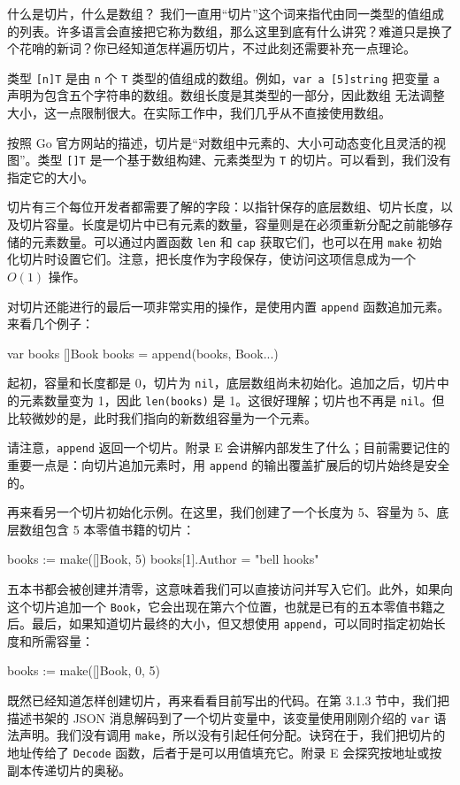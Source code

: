 \begin{infobox}{什么是切片，什么是数组？}
我们一直用“切片”这个词来指代由同一类型的值组成的列表。许多语言会直接把它称为数组，那么这里到底有什么讲究？难道只是换了个花哨的新词？你已经知道怎样遍历切片，不过此刻还需要补充一点理论。

类型 \texttt{[n]T} 是由 \texttt{n} 个 \texttt{T} 类型的值组成的数组。例如，\texttt{var a [5]string} 把变量 \texttt{a} 声明为包含五个字符串的数组。数组长度是其类型的一部分，因此数组
无法调整大小，这一点限制很大。在实际工作中，我们几乎从不直接使用数组。

按照 Go 官方网站的描述，切片是“对数组中元素的、大小可动态变化且灵活的视图”。类型 \texttt{[]T} 是一个基于数组构建、元素类型为 \texttt{T} 的切片。可以看到，我们没有指定它的大小。

切片有三个每位开发者都需要了解的字段：以指针保存的底层数组、切片长度，以及切片容量。长度是切片中已有元素的数量，容量则是在必须重新分配之前能够存储的元素数量。可以通过内置函数 \texttt{len} 和 \texttt{cap} 获取它们，也可以在用 \texttt{make} 初始化切片时设置它们。注意，把长度作为字段保存，使访问这项信息成为一个 \(O(1)\) 操作。

对切片还能进行的最后一项非常实用的操作，是使用内置 \texttt{append} 函数追加元素。来看几个例子：

\begin{gocode}[]
var books []Book
books = append(books, Book{...})
\end{gocode}

起初，容量和长度都是 0，切片为 \texttt{nil}，底层数组尚未初始化。追加之后，切片中的元素数量变为 1，因此 \texttt{len(books)} 是 1。这很好理解；切片也不再是 \texttt{nil}。但比较微妙的是，此时我们指向的新数组容量为一个元素。

请注意，\texttt{append} 返回一个切片。附录 E 会讲解内部发生了什么；目前需要记住的重要一点是：向切片追加元素时，用 \texttt{append} 的输出覆盖扩展后的切片始终是安全的。

再来看另一个切片初始化示例。在这里，我们创建了一个长度为 5、容量为 5、底层数组包含 5 本零值书籍的切片：

\begin{gocode}[]
books := make([]Book, 5)
books[1].Author = "bell hooks"
\end{gocode}

五本书都会被创建并清零，这意味着我们可以直接访问并写入它们。此外，如果向这个切片追加一个 \texttt{Book}，它会出现在第六个位置，也就是已有的五本零值书籍之后。最后，如果知道切片最终的大小，但又想使用 \texttt{append}，可以同时指定初始长度和所需容量：

\begin{gocode}[]
books := make([]Book, 0, 5)
\end{gocode}

既然已经知道怎样创建切片，再来看看目前写出的代码。在第 3.1.3 节中，我们把描述书架的 JSON 消息解码到了一个切片变量中，该变量使用刚刚介绍的 \texttt{var} 语法声明。我们没有调用 \texttt{make}，所以没有引起任何分配。诀窍在于，我们把切片的地址传给了 \texttt{Decode} 函数，后者于是可以用值填充它。附录 E 会探究按地址或按副本传递切片的奥秘。
\end{infobox}


